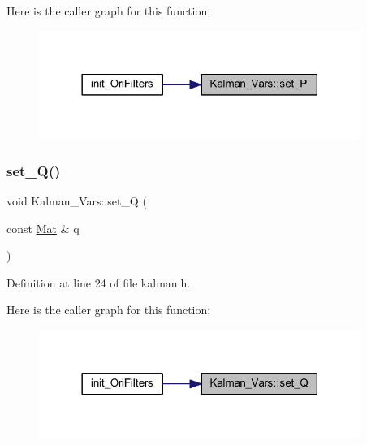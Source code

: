 Here is the caller graph for this function\+:
\nopagebreak
\begin{figure}[H]
\begin{center}
\leavevmode
\includegraphics[width=297pt]{struct_kalman___vars_a5c294937351709594ffc9c41cb183087_icgraph}
\end{center}
\end{figure}
\mbox{\label{struct_kalman___vars_aa19db0dc8a5b4d7f0db1cd18ecc20a7d}} 
\subsubsection{\texorpdfstring{set\_Q()}{set\_Q()}}
{\footnotesize\ttfamily void Kalman\+\_\+\+Vars\+::set\+\_\+Q (\begin{DoxyParamCaption}\item[{const \mbox{\hyperlink{class_mat}{Mat}} \&}]{q }\end{DoxyParamCaption})\hspace{0.3cm}{\ttfamily [inline]}}



Definition at line 24 of file kalman.\+h.

Here is the caller graph for this function\+:
\nopagebreak
\begin{figure}[H]
\begin{center}
\leavevmode
\includegraphics[width=297pt]{struct_kalman___vars_aa19db0dc8a5b4d7f0db1cd18ecc20a7d_icgraph}
\end{center}
\end{figure}
\mbox{\label{struct_kalman___vars_a49e035a9f13c4b45fd77215a8bc95309}} 
